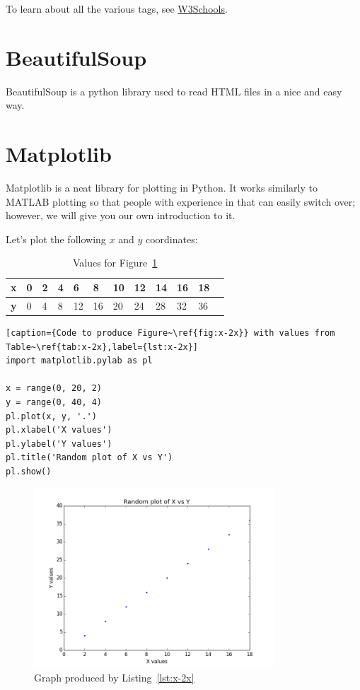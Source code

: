 \documentclass[11pt]{cselabheader}
\begin{document}
To learn about all the various tags, see
\href{http://www.w3schools.com/}{W3Schools}.

\section{BeautifulSoup}

BeautifulSoup is a python library used to read HTML files in a nice
and easy way.

\pagebreak
\section{Matplotlib}

Matplotlib is a neat library for plotting in Python. It works similarly to
MATLAB plotting so that people with experience in that can easily switch over;
however, we will give you our own introduction to it.

Let's plot the following $x$ and $y$ coordinates:

\begin{table}[!ht]
  \centering
  \begin{tabular}{ llllllllllll }
    \bfseries x & 0 & 2 & 4 & 6 & 8 & 10 & 12 & 14 & 16 & 18\\
    \midrule
    \bfseries y & 0 & 4 & 8 & 12 & 16 & 20 & 24 & 28 & 32 & 36
  \end{tabular}
  \caption{Values for Figure~\ref{fig:x-2x}}
  \label{tab:x-2x}
\end{table}

\begin{lstlisting}[caption={Code to produce Figure~\ref{fig:x-2x}} with values from Table~\ref{tab:x-2x},label={lst:x-2x}]
import matplotlib.pylab as pl

x = range(0, 20, 2)
y = range(0, 40, 4)
pl.plot(x, y, '.')
pl.xlabel('X values')
pl.ylabel('Y values')
pl.title('Random plot of X vs Y')
pl.show()
\end{lstlisting}

\begin{figure}[!ht]
  \centering
  \includegraphics[width=0.8\textwidth]{lab11/x-2x-plot.png}
  \caption{Graph produced by Listing~\ref{lst:x-2x}}
  \label{fig:x-2x}
\end{figure}
\end{document}

